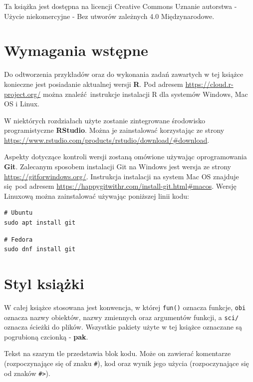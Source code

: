 \documentclass[paper=6in:9in,pagesize=pdftex,headinclude=on,footinclude=on,10pt]{scrbook}
\begin{document}
Ta książka jest dostępna na licencji Creative Commons Uznanie autorstwa - Użycie niekomercyjne - Bez utworów zależnych 4.0 Międzynarodowe.

\hypertarget{wymagania-wstux119pne}{%
\section*{Wymagania wstępne}\label{wymagania-wstux119pne}}

Do odtworzenia przykładów oraz do wykonania zadań zawartych w tej książce konieczne jest posiadanie aktualnej wersji \textbf{R}.
Pod adresem \url{https://cloud.r-project.org/} można znaleźć~instrukcje instalacji R dla systemów Windows, Mac OS i Linux.

W niektórych rozdziałach użyte zostanie zintegrowane środowisko programistyczne \textbf{RStudio}.
Można je zainstalować korzystając ze strony \url{https://www.rstudio.com/products/rstudio/download/\#download}.

Aspekty dotyczące kontroli wersji zostaną omówione używając oprogramowania \textbf{Git}.
Zalecanym sposobem instalacji Git na Windows jest wersja ze strony \url{https://gitforwindows.org/}.
Instrukcja instalacji na system Mac OS znajduje się~pod adresem \url{https://happygitwithr.com/install-git.html\#macos}.
Wersję Linuxową można zainstalować używając poniższej linii kodu:

\begin{verbatim}
# Ubuntu
sudo apt install git
\end{verbatim}

\begin{verbatim}
# Fedora
sudo dnf install git
\end{verbatim}

\hypertarget{styl-ksiux105ux17cki}{%
\section*{Styl książki}\label{styl-ksiux105ux17cki}}

W całej książce stosowana jest konwencja, w której \texttt{fun()} oznacza funkcje, \texttt{obi} oznacza nazwy obiektów, nazwy zmiennych oraz argumentów funkcji, a \texttt{sci/} oznacza ścieżki do plików.
Wszystkie pakiety użyte w tej książce oznaczane są pogrubioną czcionką - \textbf{pak}.

Tekst na szarym tle przedstawia blok kodu.
Może on zawierać komentarze (rozpoczynające się of znaku \texttt{\#}), kod oraz wynik jego użycia (rozpoczynające się od znaków \texttt{\#\textgreater{}}).
\end{document}
